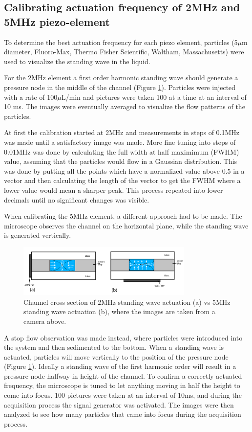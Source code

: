 \documentclass[twoside,twocolumn,9pt,a4paper]{IEEEtran}
\begin{document}
\subsection{Calibrating actuation frequency of 2MHz and 5MHz piezo-element}
To determine the best actuation frequency for each piezo element, particles (5$\mu$m diameter, Fluoro-Max, Thermo Fisher Scientific, Waltham, Massachusetts) were used to visualize the standing wave in the liquid. 

For the 2MHz element a first order harmonic standing wave should generate a pressure node in the middle of the channel (Figure \ref{2vs5Actuation}). Particles were injected with a rate of 100$\mu$L/min and pictures were taken 100 at a time at an interval of 10 ms. The images were eventually averaged to visualize the flow patterns of the particles.

At first the calibration started at 2MHz and measurements in steps of 0.1MHz was made until a satisfactory image was made. More fine tuning into steps of 0.01MHz was done by calculating the full width at half maximimum (FWHM) value, assuming that the particles would flow in a Gaussian distribution. This was done by putting all the points which have a normalized value above 0.5 in a vector and then calculating the length of the vector to get the FWHM where a lower value would mean a sharper peak. This process repeated into lower decimals until no significant changes was visible.

When calibrating the 5MHz element, a different approach had to be made. The microscope observes the channel on the horizontal plane, while the standing wave is generated vertically. 

\begin{figure}[h]
\begin{center}
\includegraphics[width=8.7cm]{Images/2and5_in_one(final).png} %
\caption{Channel cross section of 2MHz standing wave actuation (a) vs 5MHz standing wave actuation (b), where the images are taken from a camera above.}
\label{2vs5Actuation}
\end{center}
\end{figure} %

A stop flow observation was made instead, where particles were introduced into the system and then sedimented to the bottom. When a standing wave is actuated, particles will move vertically to the position of the pressure node (Figure \ref{2vs5Actuation}). Ideally a standing wave of the first harmonic order will result in a pressure node halfway in height of the channel. To confirm a correctly actuated frequency, the microscope is tuned to let anything moving in half the height to come into focus. 100 pictures were taken at an interval of 10ms, and during the acquisition process the signal generator was activated. The images were then analyzed to see how many particles that came into focus during the acquisition process.
\end{document}
